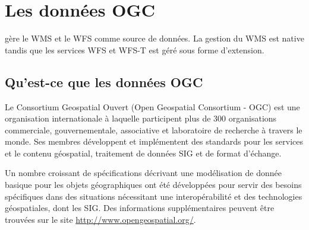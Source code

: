 \chapter{Les données OGC}\label{working_with_ogc}


\qg gère le WMS et le WFS comme source de données. La gestion du WMS est native tandis que les services WFS et WFS-T est géré sous forme d'extension.

\section{Qu'est-ce que les données OGC}

Le Consortium Geospatial Ouvert (Open Geospatial Consortium - OGC) est une organisation internationale à laquelle participent plus de 300 organisations commerciale, gouvernementale, associative et laboratoire de recherche à travers  le monde. Ses membres développent et implémentent des standards pour les services et le contenu géospatial, traitement de données SIG et de format d'échange.


Un nombre croissant de spécifications décrivant une modélisation de donnée basique pour les objets géographiques ont été développées pour servir des besoins spécifiques dans des situations nécessitant une interopérabilité et des technologies géospatiales, dont les SIG. Des informations supplémentaires peuvent être trouvées sur le site
\url{http://www.opengeospatial.org/}.

